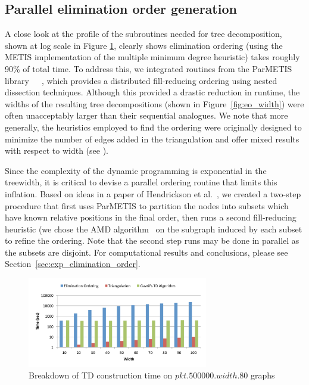 \documentclass[conference]{IEEEtran}
\begin{document}
\subsection{Parallel elimination order generation}\label{sec:elimination_order}

A close look at the profile of the subroutines needed for tree decomposition, shown at log scale in Figure \ref{fig:pkt.td}, clearly shows elimination ordering (using the METIS implementation of the multiple minimum degree heuristic) takes roughly 90\% of
total time. To address this, we integrated routines from the
ParMETIS library~\cite{Karypis1996parallel}~\cite{Karypis1996parallel_k}~\cite{Karypis1997parmetis}, which
provides a distributed fill-reducing ordering using nested dissection techniques. Although this provided
a drastic reduction in runtime, the widths of the resulting tree decompositions (shown in Figure~\ref{fig:eo_width})
were often unacceptably larger than their sequential analogues. We note that more generally, the heuristics
employed to find the ordering were originally designed to minimize the number of edges added
in the triangulation and offer mixed results with respect to width (see \cite{serialTM}).

Since the complexity of the dynamic programming
is exponential in the treewidth, it is critical to devise a parallel ordering routine that limits this
inflation. Based on ideas in a paper of Hendrickson et al.~\cite{HendricksonEO},
we created a two-step procedure that first uses ParMETIS to partition the nodes into subsets which have known
relative positions in the final order, then runs a second fill-reducing heuristic (we chose the AMD algorithm~\cite{Amestoy2004algorithm} on the subgraph induced by each subset  to refine the ordering. Note that the second step runs may be done in parallel as the subsets are disjoint. For computational results and conclusions, please see Section~\ref{sec:exp_elimination_order}.

\begin{figure}[ht]
\includegraphics[angle=0,width=3.1in]{figures/fig3_col.pdf}
\caption{Breakdown of TD construction time on $pkt.500000.width.80$ graphs}
\label{fig:pkt.td}
\end{figure}
\end{document}
